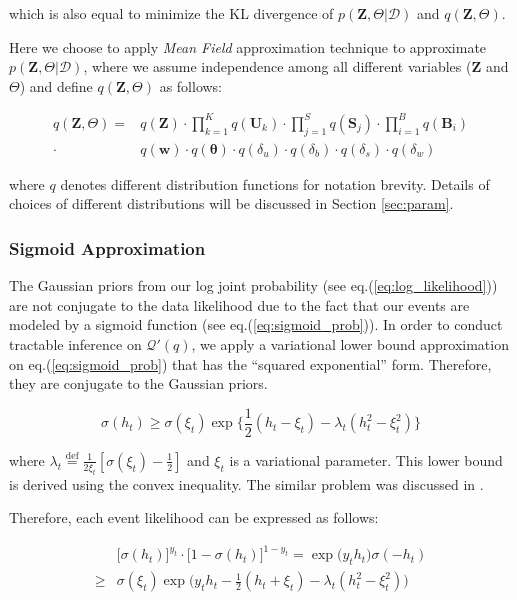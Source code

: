 \noindent which is also equal to minimize the KL divergence of $p(\bm{Z}, \Theta| \mathcal{D})$ and $q(\bm{Z}, \Theta)$.

Here we choose to apply \emph{Mean Field} approximation technique to approximate $p(\bm{Z}, \Theta| \mathcal{D})$, where we assume independence among all different variables ($\mathbf{Z}$ and $\Theta$) and define $q(\bm{Z}, \Theta)$ as follows:

\begin{align}
\label{eq:mean_field}
q(\bm{Z}, \Theta) = & q(\mathbf{Z}) \cdot \prod_{k=1}^K q(\mathbf{U}_k) \cdot \prod_{j=1}^S q(\mathbf{S}_j) \cdot \prod_{i=1}^B q(\mathbf{B}_i) \nonumber \\
\cdot & q(\mathbf{w}) \cdot q(\boldsymbol{\theta}) \cdot q(\delta_u) \cdot q(\delta_b) \cdot q(\delta_s) \cdot q(\delta_w)
\end{align}

\noindent where $q$ denotes different distribution functions for notation brevity. Details of choices of different distributions will be discussed in Section \ref{sec:param}.

\subsubsection{Sigmoid Approximation}

The Gaussian priors from our log joint probability (see eq.(\ref{eq:log_likelihood})) are not conjugate to the data likelihood due to the fact that our events are modeled by a sigmoid function (see eq.(\ref{eq:sigmoid_prob})). In order to conduct tractable inference on $\mathcal{Q}'(q)$, we apply a variational lower bound approximation on eq.(\ref{eq:sigmoid_prob}) that has the ``squared exponential'' form. Therefore, they are conjugate to the Gaussian priors.

\begin{equation*}
\sigma(h_t) \geq \sigma(\xi_t)\exp\big\{\frac{1}{2}(h_t-\xi_t)-\lambda_t(h_t^2-\xi_t^2)\big\}
\end{equation*}

\noindent where $\lambda_t\overset{\mathrm{def}}=\frac{1}{2\xi_t}[\sigma(\xi_t)-\frac{1}{2}]$ and $\xi_t$ is a variational parameter. This lower bound is derived using the convex inequality. The similar problem was discussed in \cite{jaakkola1997variational,jordan1999introduction}.

Therefore, each event likelihood can be expressed as follows:

\begin{align}
\label{eq:likelihood_approx}
& \big[\sigma(h_t)\big]^{y_t} \cdot  \big[1-\sigma(h_t) \big]^{1-y_t} = \exp\big( y_t h_t \big) \sigma(-h_t) \nonumber \\
\geq & \sigma(\xi_t)\exp \big(y_t h_t-\frac{1}{2}(h_t+\xi_t)-\lambda_t(h_t^2-\xi_t^2) \big)
\end{align}

